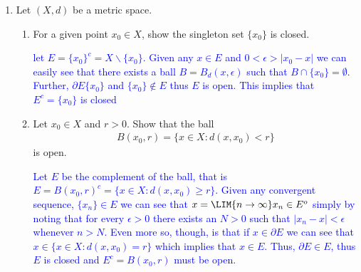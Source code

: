 \documentclass[10pt,a4paper]{report}
\newcommand{\BLUE}[1]{\textcolor{blue}{#1}}
\begin{document}
\begin{enumerate}[label=\Roman*.]
\begin{enumerate}[label=(\alph*)]
\end{enumerate}

\item Let $(X,d)$ be a metric space.
\begin{enumerate}[label=(\alph*)]
\item For a given point $x_0 \in X$, show the singleton set $\{x_0\}$ is closed.

\BLUE{let $E = \{x_0\}^c= X \backslash \{ x_0\}$.  Given any $x \in E$ and $0< \epsilon > | x_0 -x|$ we can easily see that there exists a ball $B=B_d(x, \epsilon)$ such that $B \cap \{x_0\} = \emptyset$.  Further, $\partial E  \{ x_0 \}$ and $\{x_0\}\not \in E$ thus $E$ is open.  This implies that $E^c=\{x_0\}$ is closed
}

\item Let $x_0 \in X$ and $r > 0$.  Show that the ball 
\begin{align*}
	B(x_0,r) = \{x \in X: d(x,x_0) < r\}
\end{align*}is open.

\BLUE{Let $E$ be the complement of the ball, that is $E = B(x_0,r)^c = \{x \in X: d(x,x_0) \ge r\}$.  Given any convergent sequence, $\{x_n\} \in E$ we can see that $x=\LIM{n\to\infty} x_n \in E^o$ simply by noting that for every $\epsilon > 0$ there exists an $N>0$ such that $|x_n-x|<\epsilon$ whenever $n>N$.  Even more so, though, is that if $x \in \partial E$ we can see that $x \in \{x \in X: d(x,x_0) = r\}$ which implies that $x \in E$. Thus, $\partial E \in E$, thus $E$ is closed and $E^c = B(x_0,r)$ must be open.
}
\end{enumerate}

\end{enumerate}
\end{document}
